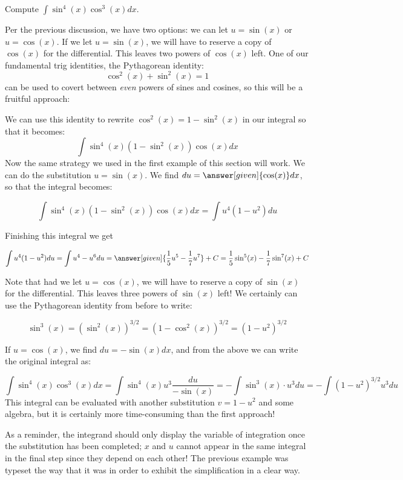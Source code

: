 \documentclass{ximera}
\begin{document}
\begin{example}
Compute $\int \sin^{4}(x) \cos^{3}(x) dx $.

\begin{explanation}
Per the previous discussion, we have two options: we can let $u= \sin(x)$ or $u=\cos(x)$.  
If we let $u = \sin(x)$, we will have to reserve a copy of $\cos(x)$ for the differential. This leaves two powers of $\cos(x)$ left.   One of our fundamental trig identities, the Pythagorean identity:
\[
\cos^{2}(x) + \sin^{2}(x)=1
\]
can be used to covert between \emph{even} powers of sines and cosines, so this will be a fruitful approach:

We can use this identity to rewrite $\cos^{2}(x)=1-\sin^{2}(x)$ in our integral so that it becomes:
\[
\int \sin^{4}(x) (1-\sin^{2}(x)) \cos(x) dx
\]
Now the same strategy we used in the first example of this section will work. We can do the substitution $u=\sin(x)$. We find $du= \answer[given]{\cos(x)} dx$, so that the integral becomes:

\[ 
\int \sin^{4}(x) (1-\sin^{2}(x)) \cos(x) dx =  \int u^{4}(1-u^{2}) du
\]

Finishing this integral we get 

\[ 
\int u^{4}(1-u^{2}) du= \int u^{4}-u^{6} du = \answer[given]{\frac{1}{5}u^5 - \frac{1}{7}u^7} + C =\frac{1}{5}\sin^{5}(x) - \frac{1}{7} \sin^{7}(x) + C
\]

Note that had we let $u = \cos(x)$, we will have to reserve a copy of $\sin(x)$ for the differential. This leaves three powers of $\sin(x)$ left! We certainly can use the Pythagorean identity from before to write:

\[ \sin^3(x) = \left(\sin^2(x)\right)^{3/2} = \left(1-\cos^2(x)\right)^{3/2} = (1-u^2)^{3/2} \]

If $u = \cos(x)$, we find $du = -\sin(x) dx$, and from the above we can write the original integral as:

\[ 
\int \sin^{4}(x) \cos^{3}(x) dx = \int \sin^4(x) u^3 \frac{du}{-\sin(x)} = -\int \sin^3(x) \cdot u^3 du = -\int (1-u^2)^{3/2} u^3 du
\]
This integral can be evaluated with another substitution $v = 1-u^2$ and some algebra, but it is certainly more time-consuming than the first approach!

\end{explanation}

\begin{remark}
As a reminder, the integrand should only display the variable of integration once the substitution has been completed; $x$ and $u$ cannot appear in the same integral in the final step since they depend on each other!  The previous example was typeset the way that it was in order to exhibit the simplification in a clear way.
\end{remark}
\end{example}
\end{document}

